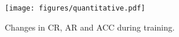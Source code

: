 
\begin{figure}[!t]
    \begin{center}
    \texttt{[image: figures/quantitative.pdf]}
    \end{center}
    \caption{Changes in CR, AR and ACC during training.}
    \label{fig:quantitative}
\end{figure}

    